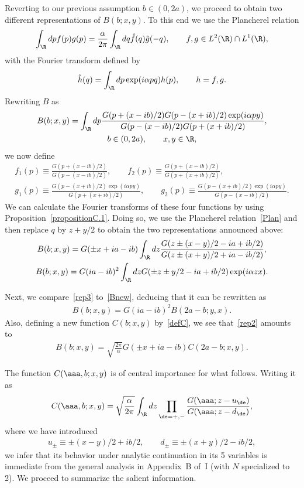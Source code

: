 Reverting to our previous assumption $b\in(0,2a)$, we proceed to obtain two dif\/ferent representations of $B(b;x,y)$. To this end we use the Plancherel relation
\begin{gather}\label{Plan}
\int_{\R}dpf(p)g(p)=\frac{\alpha}{2\pi}\int_{\R}dq\hat{f}(q)\hat{g}(-q),\qquad f,g\in L^2(\R)\cap L^1(\R),
\end{gather}
with the Fourier transform def\/ined by
\begin{gather}\label{Four}
\hat{h}(q)=\int_{\R}dp\exp(i\alpha pq)h(p),\qquad h=f,g.
\end{gather}
Rewriting $B$ as
\begin{gather}\label{Bnew}
B(b;x,y)=\int_{\R}dp\frac{G(p+(x-ib)/2)G(p-(x+ib)/2)\exp(i\alpha py)}{G(p-(x-ib)/2)G(p+(x+ib)/2)},\\
 b\in(0,2a),\qquad x,y\in\R,\nonumber
\end{gather}
we now def\/ine
\begin{gather}
f_1(p)\equiv\frac{G(p+(x-ib)/2)}{G(p-(x-ib)/2)},\qquad f_2(p)\equiv\frac{G(p+(x-ib)/2)}{G(p+(x+ib)/2)},
\\
g_1(p)\equiv\frac{G(p-(x+ib)/2)\exp(i\alpha py)}{G(p+(x+ib)/2)},\qquad
g_2(p)\equiv\frac{G(p-(x+ib)/2)\exp(i\alpha py)}{G(p-(x-ib)/2)}.
\end{gather}
We can calculate the Fourier transforms of these four functions by using Proposition~\ref{propositionC.1}. Doing so, we use the Plancherel relation~\eqref{Plan} and then replace $q$ by $z+y/2$ to obtain the two representations announced above:
\begin{gather}\label{rep2}
B(b;x,y)=G(\pm x +ia-ib)\int_{\R}dz \frac{G(z\pm (x-y)/2-ia+ib/2)}{G(z\pm (x+y)/2+ia-ib/2)},
\\
\label{rep3}
B(b;x,y)=G(ia-ib)^2\int_{\R}dz G(\pm z\pm y/2-ia+ib/2)\exp(i\alpha zx).
\end{gather}

Next, we compare~\eqref{rep3} to~\eqref{Bnew}, deducing that it can be rewritten as
\begin{gather}\label{BB}
B(b;x,y)=G(ia-ib)^2B(2a-b;y,x).
\end{gather}
Also, def\/ining a new function $C(b;x,y)$ by~\eqref{defC},
we see that~\eqref{rep2} amounts to
\begin{gather}\label{BC}
B(b;x,y)=\sqrt{\frac{2\pi}{\alpha}}G(\pm x +ia-ib)C(2a-b;x,y).
\end{gather}

The function $C(\aaa,b;x,y)$ is of central importance for what follows. Writing it as
\begin{gather}
C(\aaa,b;x,y)= \sqrt{\frac{\alpha}{2\pi}}\int_{\R}dz \prod_{\de=+,-}\frac{G(\aaa;z-u_{\de})}{G(\aaa;z-d_{\de})},
\end{gather}
where we have introduced
\begin{gather}
u_{\pm}\equiv \pm (x-y)/2+ib/2,\qquad d_{\pm}\equiv \pm (x+y)/2-ib/2,
\end{gather}
we infer that its behavior under analytic continuation in its 5 variables is immediate from the general analysis in Appendix~B of~I (with $N$ specialized to 2). We proceed to summarize the salient information.

